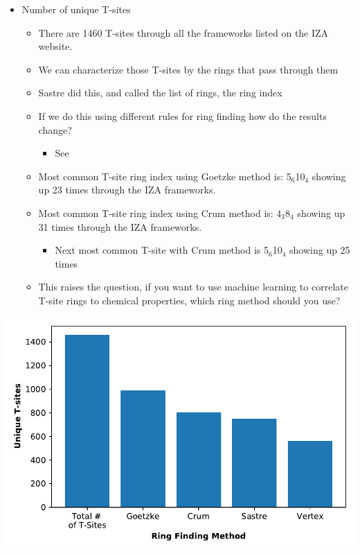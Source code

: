 \documentclass[11pt]{article}
\begin{document}
\begin{itemize}
\item Number of unique T-sites
\begin{itemize}
\item There are 1460 T-sites through all the frameworks listed on the IZA website.
\item We can characterize those T-sites by the rings that pass through them
\item Sastre did this, and called the list of rings, the ring index
\item If we do this using different rules for ring finding how do the results change?
\begin{itemize}
\item See 
\end{itemize}
\item Most common T-site ring index using Goetzke method is: 5\(_{\text{6}}\)\textbullet{}10\(_{\text{4}}\) showing up 23 times through the IZA frameworks.
\item Most common T-site ring index using Crum method is: 4\(_{\text{3}}\)\textbullet{}8\(_{\text{4}}\) showing up 31 times through the IZA frameworks.
\begin{itemize}
\item Next most common T-site with Crum method is 5\(_{\text{6}}\)\textbullet{}10\(_{\text{4}}\) showing up 25 times
\end{itemize}
\item This raises the question, if you want to use machine learning to correlate T-site rings to chemical properties, which ring method should you use?
\end{itemize}
\end{itemize}
\begin{center}
\includegraphics[width=.6\textwidth]{../figures/completed-figures/unique-ts.pdf}
\end{center}
\end{document}
